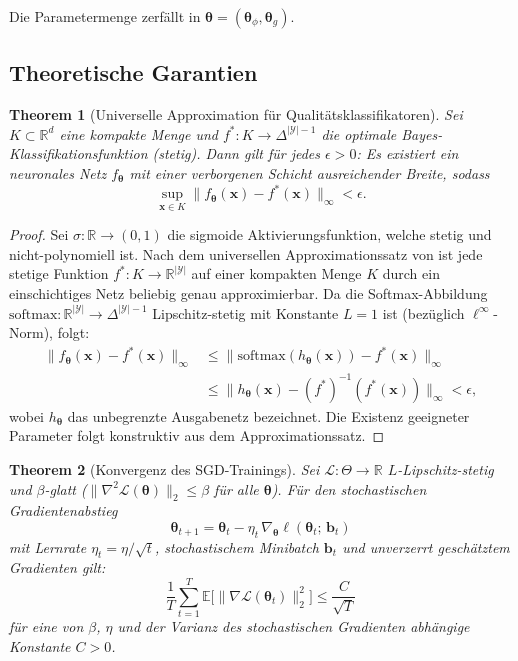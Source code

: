 ﻿\documentclass[12pt,a4paper]{article}
\theoremstyle{plain}
\newtheorem{theorem}{Theorem}[section]
\theoremstyle{definition}
\begin{document}
	Die Parametermenge zerfällt in $\boldsymbol{\theta} = (\boldsymbol{\theta}_\phi, \boldsymbol{\theta}_g)$.
	
	\subsection{Theoretische Garantien}
	
	\begin{theorem}[Universelle Approximation für Qualitätsklassifikatoren]
		\label{thm:ua}
		Sei $K \subset \mathbb{R}^d$ eine kompakte Menge und
		$f^* : K \to \Delta^{|\mathcal{Y}|-1}$ die optimale Bayes-Klassifikationsfunktion
		(stetig). Dann gilt für jedes $\epsilon > 0$: Es existiert ein neuronales
		Netz $f_{\boldsymbol{\theta}}$ mit einer verborgenen Schicht ausreichender
		Breite, sodass
		\[
		\sup_{\mathbf{x} \in K}
		\bigl\|f_{\boldsymbol{\theta}}(\mathbf{x}) - f^*(\mathbf{x})\bigr\|_\infty
		< \epsilon.
		\]
	\end{theorem}
	
	\begin{proof}
		Sei $\sigma : \mathbb{R} \to (0,1)$ die sigmoide Aktivierungsfunktion,
		welche stetig und nicht-polynomiell ist. Nach dem universellen
		Approximationssatz von \cite{hornik1989} ist jede stetige Funktion
		$f^* : K \to \mathbb{R}^{|\mathcal{Y}|}$ auf einer kompakten Menge $K$
		durch ein einschichtiges Netz beliebig genau approximierbar. Da die
		Softmax-Abbildung $\mathrm{softmax} : \mathbb{R}^{|\mathcal{Y}|} \to
		\Delta^{|\mathcal{Y}|-1}$ Lipschitz-stetig mit Konstante $L = 1$ ist
		(bezüglich $\ell^\infty$-Norm), folgt:
		\begin{align*}
			\bigl\|f_{\boldsymbol{\theta}}(\mathbf{x}) - f^*(\mathbf{x})\bigr\|_\infty
			&\leq \bigl\|\mathrm{softmax}(h_{\boldsymbol{\theta}}(\mathbf{x}))
			- f^*(\mathbf{x})\bigr\|_\infty \\
			&\leq \bigl\|h_{\boldsymbol{\theta}}(\mathbf{x})
			- (f^*)^{-1}(f^*(\mathbf{x}))\bigr\|_\infty
			< \epsilon,
		\end{align*}
		wobei $h_{\boldsymbol{\theta}}$ das unbegrenzte Ausgabenetz bezeichnet.
		Die Existenz geeigneter Parameter folgt konstruktiv aus dem
		Approximationssatz.
	\end{proof}
	
	\begin{theorem}[Konvergenz des SGD-Trainings]
		\label{thm:sgd}
		Sei $\mathcal{L} : \Theta \to \mathbb{R}$ $L$-Lipschitz-stetig und
		$\beta$-glatt ($\|\nabla^2 \mathcal{L}(\boldsymbol{\theta})\|_2 \leq \beta$
		für alle $\boldsymbol{\theta}$). Für den stochastischen Gradientenabstieg
		\[
		\boldsymbol{\theta}_{t+1} = \boldsymbol{\theta}_t -
		\eta_t \,\nabla_{\boldsymbol{\theta}} \ell(\boldsymbol{\theta}_t;\,
		\mathbf{b}_t)
		\]
		mit Lernrate $\eta_t = \eta / \sqrt{t}$, stochastischem Minibatch
		$\mathbf{b}_t$ und unverzerrt geschätztem Gradienten gilt:
		\[
		\frac{1}{T} \sum_{t=1}^{T}
		\mathbb{E}\bigl[\bigl\|\nabla \mathcal{L}(\boldsymbol{\theta}_t)\bigr\|_2^2\bigr]
		\leq \frac{C}{\sqrt{T}}
		\]
		für eine von $\beta$, $\eta$ und der Varianz des stochastischen Gradienten
		abhängige Konstante $C > 0$.
	\end{theorem}
	
\end{document}
